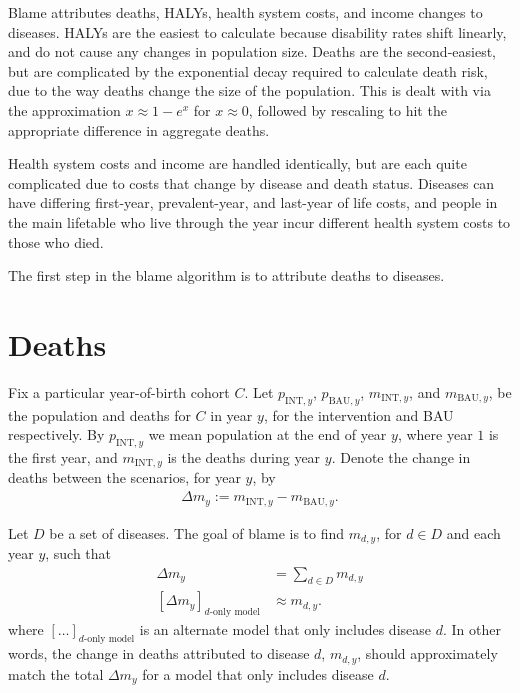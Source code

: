 \documentclass[]{article}
\begin{document}
Blame attributes deaths, HALYs, health system costs, and income changes to diseases. HALYs are the easiest to calculate because disability rates shift linearly, and do not cause any changes in population size. Deaths are the second-easiest, but are complicated by the exponential decay required to calculate death risk, due to the way deaths change the size of the population. This is dealt with via the approximation $x \approx 1 - e^x$ for $x \approx 0$, followed by rescaling to hit the appropriate difference in aggregate deaths.

Health system costs and income are handled identically, but are each quite complicated due to costs that change by disease and death status. Diseases can have differing first-year, prevalent-year, and last-year of life costs, and people in the main lifetable who live through the year incur different health system costs to those who died.

The first step in the blame algorithm is to attribute deaths to diseases.

\section{Deaths}

Fix a particular year-of-birth cohort $C$. Let $p_{\text{INT}, y}$, $p_{\text{BAU}, y}$, $m_{\text{INT}, y}$, and $m_{\text{BAU}, y}$, be the population and deaths for $C$ in year $y$, for the intervention and BAU respectively. By $p_{\text{INT}, y}$ we mean population at the end of year $y$, where year $1$ is the first year, and $m_{\text{INT}, y}$ is the deaths during year $y$. Denote the change in deaths between the scenarios, for year $y$, by
\begin{align*}
	\Delta m_y := m_{\text{INT}, y} - m_{\text{BAU}, y}.
\end{align*}

Let $D$ be a set of diseases. The goal of blame is to find $m_{d, y}$, for $d \in D$ and each year $y$, such that
\begin{align*}
	\Delta m_y &= \sum_{d \in D} m_{d, y} \\
	[\Delta m_y]_\text{$d$-only model} &\approx m_{d, y}.
\end{align*}
where $[\ldots]_\text{$d$-only model}$ is an alternate model that only includes disease $d$. In other words, the change in deaths attributed to disease $d$, $m_{d, y}$, should approximately match the total $\Delta m_y$ for a model that only includes disease $d$. 
\end{document}
